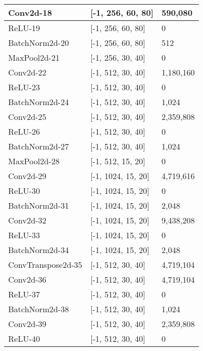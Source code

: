 \begin{table}[]
\begin{center}
\begin{tabular}{| l | l | p{3cm} |}
    			Conv2d-18          & {[}-1, 256, 60, 80{]}   & 590,080   \\ \hline
    			ReLU-19            & {[}-1, 256, 60, 80{]}   & 0         \\ \hline
    			BatchNorm2d-20     & {[}-1, 256, 60, 80{]}   & 512       \\ \hline
    			MaxPool2d-21       & {[}-1, 256, 30, 40{]}   & 0         \\ \hline
    			Conv2d-22          & {[}-1, 512, 30, 40{]}   & 1,180,160 \\ \hline
    			ReLU-23            & {[}-1, 512, 30, 40{]}   & 0         \\ \hline
    			BatchNorm2d-24     & {[}-1, 512, 30, 40{]}   & 1,024     \\ \hline
    			Conv2d-25          & {[}-1, 512, 30, 40{]}   & 2,359,808 \\ \hline
    			ReLU-26            & {[}-1, 512, 30, 40{]}   & 0         \\ \hline
    			BatchNorm2d-27     & {[}-1, 512, 30, 40{]}   & 1,024     \\ \hline
    			MaxPool2d-28       & {[}-1, 512, 15, 20{]}   & 0         \\ \hline
    			Conv2d-29          & {[}-1, 1024, 15, 20{]}  & 4,719,616 \\ \hline
    			ReLU-30            & {[}-1, 1024, 15, 20{]}  & 0         \\ \hline
    			BatchNorm2d-31     & {[}-1, 1024, 15, 20{]}  & 2,048     \\ \hline
    			Conv2d-32          & {[}-1, 1024, 15, 20{]}  & 9,438,208 \\ \hline
    			ReLU-33            & {[}-1, 1024, 15, 20{]}  & 0         \\ \hline
    			BatchNorm2d-34     & {[}-1, 1024, 15, 20{]}  & 2,048     \\ \hline
    			ConvTranspose2d-35 & {[}-1, 512, 30, 40{]}   & 4,719,104 \\ \hline
    			Conv2d-36          & {[}-1, 512, 30, 40{]}   & 4,719,104 \\ \hline
    			ReLU-37            & {[}-1, 512, 30, 40{]}   & 0         \\ \hline
    			BatchNorm2d-38     & {[}-1, 512, 30, 40{]}   & 1,024     \\ \hline
    			Conv2d-39          & {[}-1, 512, 30, 40{]}   & 2,359,808 \\ \hline
    			ReLU-40            & {[}-1, 512, 30, 40{]}   & 0         \\ \hline

\end{tabular}
\end{center}
\end{table}
